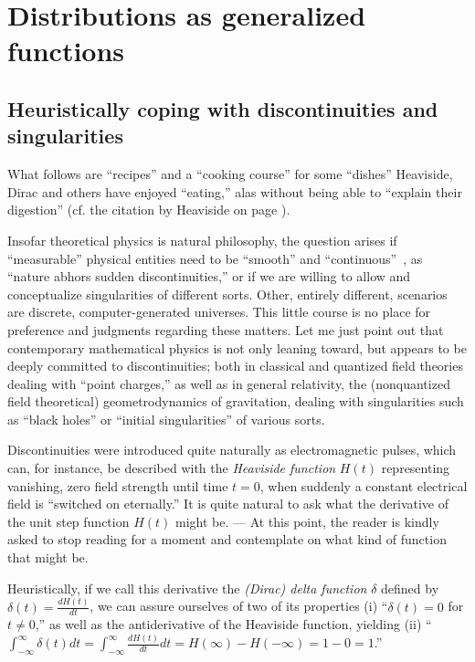 \chapter{Distributions as generalized functions}
\label{2011-m-ch:gf}

\section{Heuristically coping with discontinuities and singularities}

What follows are ``recipes'' and a ``cooking course'' for some ``dishes'' Heaviside, Dirac and others
have enjoyed ``eating,'' alas without being able to ``explain their digestion''
(cf. the citation by Heaviside on page \pageref{2013-m-ch-intro-cooking}).

Insofar theoretical physics is natural philosophy,
the question arises if ``measurable'' physical entities need to be ``smooth'' and ``continuous''~\cite{trench},
as ``nature abhors sudden discontinuities,''
or if we are willing to allow and conceptualize singularities of different sorts.
Other, entirely different,
scenarios are discrete,
computer-generated universes.
This little course is no place for preference and judgments regarding these matters.
Let me just point out that contemporary mathematical physics is not only leaning toward,
but appears to be deeply committed to discontinuities;
both in classical and quantized field theories dealing with
 ``point charges,''
as well as in general relativity,  the (nonquantized field theoretical)
geometrodynamics of gravitation,
dealing with singularities such as ``black holes'' or ``initial singularities'' of various sorts.

Discontinuities were introduced quite naturally as electromagnetic pulses,
which can, for instance, be described with the {\em Heaviside function}
$H(t)$ representing vanishing, zero field strength until time $t=0$, when suddenly a constant electrical field is
``switched on eternally.''
It is quite natural to ask what the derivative of the unit step function $H(t)$ might be.
---
At this point, the reader is kindly asked to stop reading for a moment and contemplate
on what kind of function that might be.

Heuristically, if we call this derivative the {\em (Dirac) delta function} $\delta$ defined by
$\delta (t)= \frac{d H(t)}{dt}$,
we can assure ourselves of two of its properties
(i) ``$\delta (t) =0$ for $t\neq 0$,''
as well as the antiderivative of the Heaviside function, yielding
(ii) ``$\int_{-\infty}^\infty \delta (t) dt  = \int_{-\infty}^\infty \frac{d H(t)}{dt} dt  =
H(\infty ) - H(-\infty ) = 1-0=1$.''

